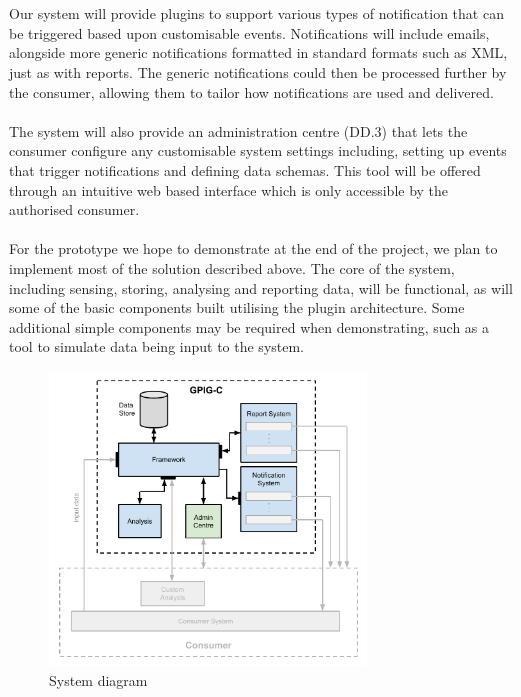 \documentclass[10pt,a4paper]{article}
\begin{document}
\\ \\
Our system will provide plugins to support various types of notification that can be triggered based upon customisable events. Notifications will include  emails, alongside more generic notifications formatted in standard formats such as XML, just as with reports. The generic notifications could then be processed further by the consumer, allowing them to tailor how notifications are used and delivered.
\\ \\
The system will also provide an administration centre (DD.3) that lets the consumer configure any customisable system settings including, setting up events that trigger notifications and defining data schemas. This tool will be offered through an intuitive web based interface which is only accessible by the authorised consumer.
\\ \\
For the prototype we hope to demonstrate at the end of the project, we plan to implement most of the solution described above. The core of the system, including sensing, storing, analysing and reporting data, will be functional, as will some of the basic components built utilising the plugin architecture. Some additional simple components may be required when demonstrating, such as a tool to simulate data being input to the system. 



\begin{figure}[hptb]
  \centering
\includegraphics[width=0.75\textwidth]{system-architecture.pdf}
  \caption{System diagram}
\end{figure}
\end{document}

